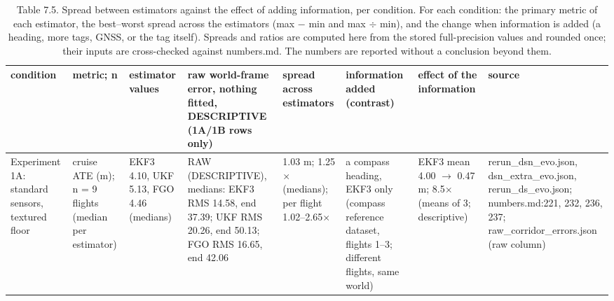 \begin{table}[htbp]
\centering
\scriptsize
\caption{Table 7.5. Spread between estimators against the effect of adding information, per condition. For each condition: the primary metric of each estimator, the best--worst spread across the estimators (max $-$ min and max $\div$ min), and the change when information is added (a heading, more tags, GNSS, or the tag itself). Spreads and ratios are computed here from the stored full-precision values and rounded once; their inputs are cross-checked against numbers.md. The numbers are reported without a conclusion beyond them.}
\label{tab:7-5}
\begin{tabular}{p{}p{}p{}p{}p{}p{}p{}p{}}
\toprule
\textbf{condition} & \textbf{metric; n} & \textbf{estimator values} & \textbf{raw world-frame error, nothing fitted, DESCRIPTIVE (1A/1B rows only)} & \textbf{spread across estimators} & \textbf{information added (contrast)} & \textbf{effect of the information} & \textbf{source} \\
\midrule
Experiment 1A: standard sensors, textured floor & cruise ATE (m); n = 9 flights (median per estimator) & EKF3 4.10, UKF 5.13, FGO 4.46 (medians) & RAW (DESCRIPTIVE), medians: EKF3 RMS 14.58, end 37.39; UKF RMS 20.26, end 50.13; FGO RMS 16.65, end 42.06 & 1.03 m; 1.25$\times$ (medians); per flight 1.02--2.65$\times$ & a compass heading, EKF3 only (compass reference dataset, flights 1--3; different flights, same world) & EKF3 mean 4.00 $\rightarrow$ 0.47 m; 8.5$\times$ (means of 3; descriptive) & rerun\_dsn\_evo.json, dsn\_extra\_evo.json, rerun\_ds\_evo.json; numbers.md:221, 232, 236, 237; raw\_corridor\_errors.json (raw column) \\

\end{tabular}
\end{table}
